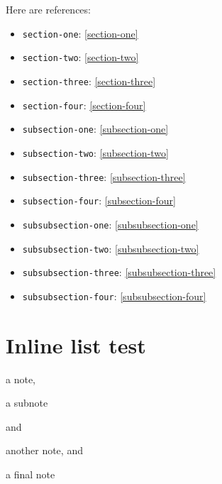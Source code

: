\documentclass{article}
\begin{document}
Here are references:

\begin{itemize}
\item \texttt{section-one}: \ref{section-one}
\item \texttt{section-two}: \ref{section-two}
\item \texttt{section-three}: \ref{section-three}
\item \texttt{section-four}: \ref{section-four}
\item \texttt{subsection-one}: \ref{subsection-one}
\item \texttt{subsection-two}: \ref{subsection-two}
\item \texttt{subsection-three}: \ref{subsection-three}
\item \texttt{subsection-four}: \ref{subsection-four}
\item \texttt{subsubsection-one}: \ref{subsubsection-one}
\item \texttt{subsubsection-two}: \ref{subsubsection-two}
\item \texttt{subsubsection-three}: \ref{subsubsection-three}
\item \texttt{subsubsection-four}: \ref{subsubsection-four}
\end{itemize}

\section{Inline list test}

\begin{inline} \item a note, \begin{inline} \item a subnote \end{inline} and \item another note, and \item a final note \end{inline}
\end{document}
